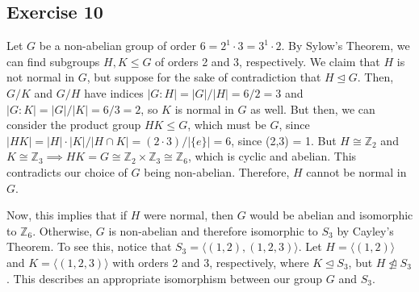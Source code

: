 \subsection*{Exercise 10}
Let $G$ be a non-abelian group of order $6 = 2^1\cdot3 = 3^1\cdot2$. By Sylow's Theorem, we can find subgroups $H,K \le G$ of orders 2 and 3, respectively. We claim that $H$ is not normal in $G$, but suppose for the sake of contradiction that $H \trianglelefteq G$. Then, $G/K$ and $G/H$ have indices $|G:H| = |G|/|H| = 6/2 = 3$ and $|G:K| = |G|/|K| = 6/3 = 2$, so $K$ is normal in $G$ as well. But then, we can consider the product group $HK \le G$, which must be $G$, since $|HK| = |H|\cdot|K|/|H\cap K| = (2\cdot 3)/|\{e\}| = 6$, since (2,3) = 1. But $H \cong \mathbb{Z}_2$ and $K \cong \mathbb{Z}_3 \implies HK = G \cong \mathbb{Z}_2 \times \mathbb{Z}_3 \cong \mathbb{Z}_6$, which is cyclic and abelian. This contradicts our choice of $G$ being non-abelian. Therefore, $H$ cannot be normal in $G$.

Now, this implies that if $H$ were normal, then $G$ would be abelian and isomorphic to $\mathbb{Z}_6$. Otherwise, $G$ is non-abelian and therefore isomorphic to $S_3$ by Cayley's Theorem. To see this, notice that $S_3 = \langle (1,2), (1,2,3) \rangle$. Let $H = \langle (1,2) \rangle$ and $K = \langle (1,2,3) \rangle$ with orders 2 and 3, respectively, where $K \trianglelefteq S_3$, but $H \not\trianglelefteq S_3$. This describes an appropriate isomorphism between our group $G$ and $S_3$.